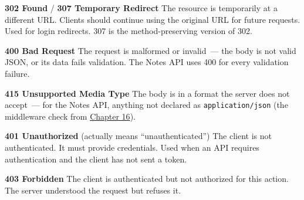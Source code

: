 \textbf{302 Found} / \textbf{307 Temporary Redirect}
The resource is temporarily at a different URL. Clients should continue using the original URL for future requests. Used for login redirects. 307 is the method-preserving version of 302.

\textbf{400 Bad Request}
The request is malformed or invalid~--- the body is not valid JSON, or its data fails validation. The Notes API uses 400 for every validation failure.

\begin{codebox}[short]

\begin{Shaded}
\begin{Highlighting}[]
\NormalTok{: }\NormalTok{\}), }
\end{Highlighting}
\end{Shaded}

\end{codebox}

\noindent{}\textbf{415 Unsupported Media Type}
The body is in a format the server does not accept~--- for the Notes API, anything not declared as \texttt{application/json} (the middleware check from \hyperref[ch:16-logging-error-handling]{Chapter 16}).

\textbf{401 Unauthorized} (actually means ``unauthenticated'')
The client is not authenticated. It must provide credentials. Used when an API requires authentication and the client has not sent a token.

\begin{codebox}[short]

\begin{Shaded}
\begin{Highlighting}[]
\NormalTok{: }\NormalTok{\}), }
\end{Highlighting}
\end{Shaded}

\end{codebox}

\noindent{}\textbf{403 Forbidden}
The client is authenticated but not authorized for this action. The server understood the request but refuses it.

\begin{codebox}[short]

\begin{Shaded}
\begin{Highlighting}[]
\NormalTok{: }\NormalTok{\}), }
\end{Highlighting}
\end{Shaded}

\end{codebox}

